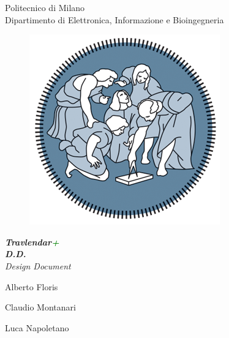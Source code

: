 \thispagestyle{empty}
\begin{center}

	\Huge Politecnico di Milano  \\   	\vspace{14pt}
    \Large Dipartimento di Elettronica, Informazione e Bioingegneria
    
    \vspace{30pt}
    
      \begin{figure}[h]
      	\centering
        \includegraphics[scale=0.7]{Pictures/logo.png}
      \end{figure}
    
    \vspace{25pt}
    
    \Huge \textbf{\emph{Travlendar\textcolor{Green}{+}}} 
    \\
    \vspace{12pt}
    \huge \textbf{\emph{D.D.}} \\
    \vspace{7pt}
    \Large \emph{Design Document} \\
    
    \vspace{100pt}
    
    \large Alberto Floris \\
    
    \vspace{5pt}
    
    \large Claudio Montanari \\
    
    \vspace{5pt}
    
    \large Luca Napoletano
    
    
\end{center}